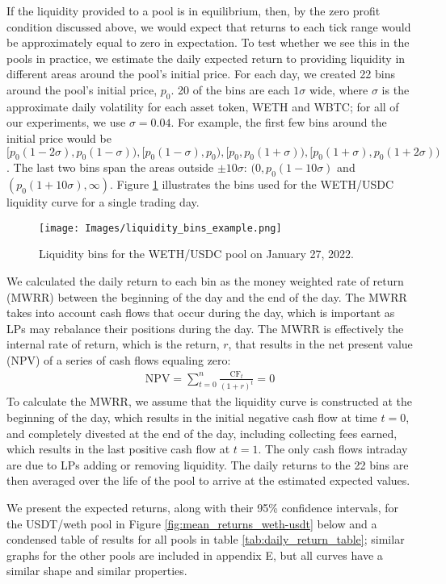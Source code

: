 \documentclass[11pt]{article}
\begin{document}
If the liquidity provided to a pool is in equilibrium, then, by the zero profit condition discussed above, we would expect that returns to each tick range would be approximately equal to zero in expectation. To test whether we see this in the pools in practice, we estimate the daily expected return to providing liquidity in different areas around the pool's initial price. For each day, we created 22 bins around the pool's initial price, $p_0$. 20 of the bins are each $1\sigma$ wide, where $\sigma$ is the approximate daily volatility for each asset token, WETH and WBTC; for all of our experiments, we use $\sigma=0.04$. For example, the first few bins around the initial price would be $[p_0(1 - 2\sigma), p_0(1 - \sigma)), [p_0(1 - \sigma), p_0), [p_0, p_0(1 + \sigma)), [p_0(1 + \sigma), p_0(1 + 2\sigma))$. The last two bins span the areas outside $\pm 10\sigma$: $(0, p_0(1 - 10\sigma)$ and $(p_0(1 + 10\sigma), \infty)$. Figure \ref{fig:liquidity_bins} illustrates the bins used for the WETH/USDC liquidity curve for a single trading day.

\begin{figure}[H]
    \centering
    \texttt{[image: Images/liquidity\_bins\_example.png]}
    \caption{Liquidity bins for the WETH/USDC pool on January 27, 2022.}
    \label{fig:liquidity_bins}
\end{figure}

We calculated the daily return to each bin as the money weighted rate of return (MWRR) between the beginning of the day and the end of the day. The MWRR takes into account cash flows that occur during the day, which is important as LPs may rebalance their positions during the day. The MWRR is effectively the internal rate of return, which is the return, $r$, that results in the net present value (NPV) of a series of cash flows equaling zero:
\begin{gather*}
    \text{NPV} = \sum_{t=0}^{n} \frac{\text{CF}_t}{(1 + r)^t} = 0
\end{gather*}
To calculate the MWRR, we assume that the liquidity curve is constructed at the beginning of the day, which results in the initial negative cash flow at time $t=0$, and completely divested at the end of the day, including collecting fees earned, which results in the last positive cash flow at $t=1$. The only cash flows intraday are due to LPs adding or removing liquidity. The daily returns to the 22 bins are then averaged over the life of the pool to arrive at the estimated expected values.

We present the expected returns, along with their 95\% confidence intervals, for the USDT/\gls{weth} pool in Figure \ref{fig:mean_returns_weth-usdt} below and a condensed table of results for all pools in table \ref{tab:daily_return_table}; similar graphs for the other pools are included in appendix E, but all curves have a similar shape and similar properties.
\end{document}

